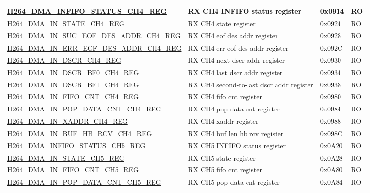 \begin{longtable}{ | p{7.5cm} | p{5.7cm} | p{1.2cm} | p{1cm} | }
    \hyperref[regdesc:H264DMAINFIFOSTATUSCH4REG]{H264\_DMA\_INFIFO\_STATUS\_CH4\_REG} & RX CH4 INFIFO status register & 0x0914 & RO \\ \hline
    \hyperref[regdesc:H264DMAINSTATECH4REG]{H264\_DMA\_IN\_STATE\_CH4\_REG} & RX CH4 state register & 0x0924 & RO \\ \hline
    \hyperref[regdesc:H264DMAINSUCEOFDESADDRCH4REG]{H264\_DMA\_IN\_SUC\_EOF\_DES\_ADDR\_CH4\_REG} & RX CH4 eof des addr register & 0x0928 & RO \\ \hline
    \hyperref[regdesc:H264DMAINERREOFDESADDRCH4REG]{H264\_DMA\_IN\_ERR\_EOF\_DES\_ADDR\_CH4\_REG} & RX CH4 err eof des addr register & 0x092C & RO \\ \hline
    \hyperref[regdesc:H264DMAINDSCRCH4REG]{H264\_DMA\_IN\_DSCR\_CH4\_REG} & RX CH4 next dscr addr register & 0x0930 & RO \\ \hline
    \hyperref[regdesc:H264DMAINDSCRBF0CH4REG]{H264\_DMA\_IN\_DSCR\_BF0\_CH4\_REG} & RX CH4 last dscr addr register & 0x0934 & RO \\ \hline
    \hyperref[regdesc:H264DMAINDSCRBF1CH4REG]{H264\_DMA\_IN\_DSCR\_BF1\_CH4\_REG} & RX CH4 second-to-last dscr addr register & 0x0938 & RO \\ \hline
    \hyperref[regdesc:H264DMAINFIFOCNTCH4REG]{H264\_DMA\_IN\_FIFO\_CNT\_CH4\_REG} & RX CH4 fifo cnt register & 0x0980 & RO \\ \hline
    \hyperref[regdesc:H264DMAINPOPDATACNTCH4REG]{H264\_DMA\_IN\_POP\_DATA\_CNT\_CH4\_REG} & RX CH4 pop data cnt register & 0x0984 & RO \\ \hline
    \hyperref[regdesc:H264DMAINXADDRCH4REG]{H264\_DMA\_IN\_XADDR\_CH4\_REG} & RX CH4 xaddr register & 0x0988 & RO \\ \hline
    \hyperref[regdesc:H264DMAINBUFHBRCVCH4REG]{H264\_DMA\_IN\_BUF\_HB\_RCV\_CH4\_REG} & RX CH4 buf len hb rcv register & 0x098C & RO \\ \hline
    \hyperref[regdesc:H264DMAINFIFOSTATUSCH5REG]{H264\_DMA\_INFIFO\_STATUS\_CH5\_REG} & RX CH5 INFIFO status register & 0x0A20 & RO \\ \hline
    \hyperref[regdesc:H264DMAINSTATECH5REG]{H264\_DMA\_IN\_STATE\_CH5\_REG} & RX CH5 state register & 0x0A28 & RO \\ \hline
    \hyperref[regdesc:H264DMAINFIFOCNTCH5REG]{H264\_DMA\_IN\_FIFO\_CNT\_CH5\_REG} & RX CH5 fifo cnt register & 0x0A80 & RO \\ \hline
    \hyperref[regdesc:H264DMAINPOPDATACNTCH5REG]{H264\_DMA\_IN\_POP\_DATA\_CNT\_CH5\_REG} & RX CH5 pop data cnt register & 0x0A84 & RO \\ \hline

\end{longtable}
